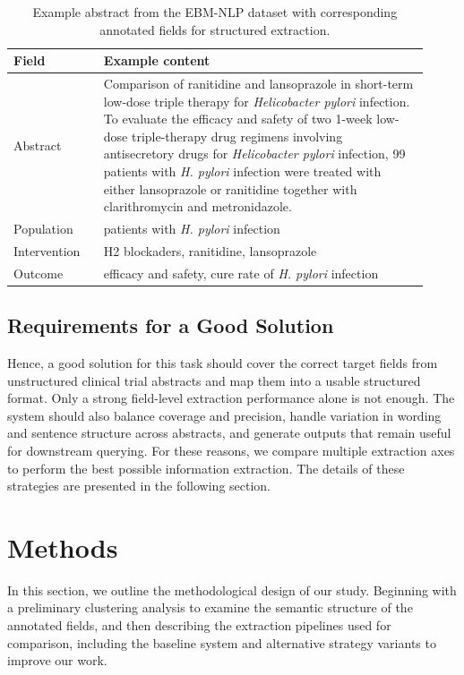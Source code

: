 \documentclass{article}
\begin{document}
\begin{table}[ht]
\centering
\small
\begin{tabular}{p{0.20\linewidth} p{0.72\linewidth}}
\hline
\textbf{Field} & \textbf{Example content} \\
\hline
Abstract & Comparison of ranitidine and lansoprazole in short-term low-dose triple therapy for \textit{Helicobacter pylori} infection. To evaluate the efficacy and safety of two 1-week low-dose triple-therapy drug regimens involving antisecretory drugs for \textit{Helicobacter pylori} infection, 99 patients with \textit{H. pylori} infection were treated with either lansoprazole or ranitidine together with clarithromycin and metronidazole. \\
Population & patients with \textit{H. pylori} infection \\
Intervention & H2 blockaders, ranitidine, lansoprazole \\
Outcome & efficacy and safety, cure rate of \textit{H. pylori} infection \\
\hline
\end{tabular}
\caption{Example abstract from the EBM-NLP dataset with corresponding annotated fields for structured extraction.}
\label{tab:ebm_example}
\end{table}


\subsection{Requirements for a Good Solution}

Hence, a good solution for this task should cover the correct target fields from unstructured clinical trial abstracts and map them into a usable structured format. Only a strong field-level extraction performance alone is not enough. The system should also balance coverage and precision, handle variation in wording and sentence structure across abstracts, and generate outputs that remain useful for downstream querying. For these reasons, we compare multiple extraction axes to perform the best possible information extraction. The details of these strategies are presented in the following section.


\section{Methods}

In this section, we outline the methodological design of our study. Beginning with a preliminary clustering analysis to examine the semantic structure of the annotated fields, and then describing the extraction pipelines used for comparison, including the baseline system and alternative strategy variants to improve our work.
\label{gen_inst}
\end{document}
